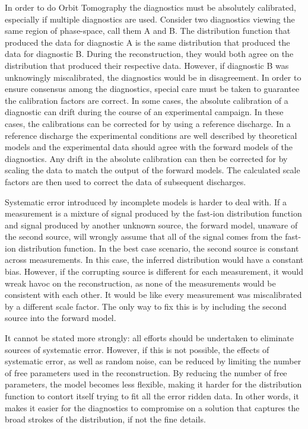 In order to do Orbit Tomography the diagnostics must be absolutely calibrated, especially if multiple diagnostics are used.
Consider two diagnostics viewing the same region of phase-space, call them A and B.
The distribution function that produced the data for diagnostic A is the same distribution that produced the data for diagnostic B.
During the reconstruction, they would both agree on the distribution that produced their respective data.
However, if diagnostic B was unknowingly miscalibrated, the diagnostics would be in disagreement.
In order to ensure consensus among the diagnostics, special care must be taken to guarantee the calibration factors are correct.
In some cases, the absolute calibration of a diagnostic can drift during the course of an experimental campaign.
In these cases, the calibrations can be corrected for by using a reference discharge. In a reference discharge the experimental conditions are well described by theoretical models and the experimental data should agree with the forward models of the diagnostics. Any drift in the absolute calibration can then be corrected for by scaling the data to match the output of the forward models. The calculated scale factors are then used to correct the data of subsequent discharges.

Systematic error introduced by incomplete models is harder to deal with.
If a measurement is a mixture of signal produced by the fast-ion distribution function and signal produced by another unknown source, the forward model, unaware of the second source, will wrongly assume that all of the signal comes from the fast-ion distribution function. In the best case scenario, the second source is constant across measurements. In this case, the inferred distribution would have a constant bias. However, if the corrupting source is different for each measurement, it would wreak havoc on the reconstruction, as none of the measurements would be consistent with each other. It would be like every measurement was miscalibrated by a different scale factor.  
The only way to fix this is by including the second source into the forward model.

It cannot be stated more strongly: all efforts should be undertaken to eliminate sources of systematic error.
However, if this is not possible, the effects of systematic error, as well as random noise, can be reduced by limiting the number of free parameters used in the reconstruction.
By reducing the number of free parameters, the model becomes less flexible, making it harder for the distribution function to contort itself trying to fit all the error ridden data.
In other words, it makes it easier for the diagnostics to compromise on a solution that captures the broad strokes of the distribution, if not the fine details. 

